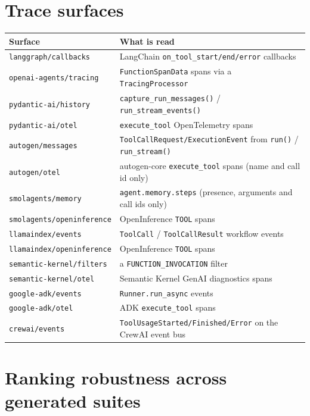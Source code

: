 \documentclass[10pt]{article}
\begin{document}
\section{Trace surfaces}
\label{app:surfaces}
\begin{small}
\begin{tabularx}{\linewidth}{lX}
\toprule
Surface & What is read \\
\midrule
\texttt{langgraph/callbacks} & LangChain \texttt{on\_tool\_start/end/error} callbacks \\
\texttt{openai-agents/tracing} & \texttt{FunctionSpanData} spans via a \texttt{TracingProcessor} \\
\texttt{pydantic-ai/history} & \texttt{capture\_run\_messages()} / \texttt{run\_stream\_events()} \\
\texttt{pydantic-ai/otel} & \texttt{execute\_tool} OpenTelemetry spans \\
\texttt{autogen/messages} & \texttt{ToolCallRequest/ExecutionEvent} from \texttt{run()} / \texttt{run\_stream()} \\
\texttt{autogen/otel} & autogen-core \texttt{execute\_tool} spans (name and call id only) \\
\texttt{smolagents/memory} & \texttt{agent.memory.steps} (presence, arguments and call ids only) \\
\texttt{smolagents/openinference} & OpenInference \texttt{TOOL} spans \\
\texttt{llamaindex/events} & \texttt{ToolCall} / \texttt{ToolCallResult} workflow events \\
\texttt{llamaindex/openinference} & OpenInference \texttt{TOOL} spans \\
\texttt{semantic-kernel/filters} & a \texttt{FUNCTION\_INVOCATION} filter \\
\texttt{semantic-kernel/otel} & Semantic Kernel GenAI diagnostics spans \\
\texttt{google-adk/events} & \texttt{Runner.run\_async} events \\
\texttt{google-adk/otel} & ADK \texttt{execute\_tool} spans \\
\texttt{crewai/events} & \texttt{ToolUsageStarted/Finished/Error} on the CrewAI event bus \\
\bottomrule
\end{tabularx}
\end{small}

\section{Ranking robustness across generated suites}
\label{app:seeds}

\end{document}
